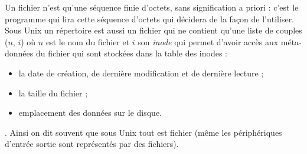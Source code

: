Un fichier n'est qu'une séquence finie d'octets, sans signification a priori : c'est le programme qui lira cette séquence d'octets qui décidera de la façon de l'utiliser. Sous Unix un répertoire est aussi un fichier qui ne contient qu'une liste de couples ($n$, $i$) où $n$ est le nom du fichier et $i$ son \emph{inode} qui permet d'avoir accès aux méta-données du fichier qui sont stockées dans la table des inodes :
\begin{itemize}
\item la date de création, de dernière modification et de dernière lecture ;
\item la taille du fichier ;
\item emplacement des données sur le disque.
\end{itemize}

. Ainsi on dit souvent que sous Unix tout est fichier (même les périphériques d'entrée sortie sont représentés par des fichiers).
